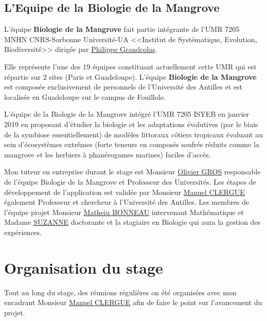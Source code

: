 
        \subsection{L'Equipe de la Biologie de la Mangrove}
        L'équipe \textbf{Biologie de la Mangrove} fait partie intégrante de l'UMR 7205 MNHN CNRS-Sorbonne Université-UA <<Institut de Systématique, Evolution, Biodiversité>> dirigée par \underline{Philippe Grandcolas}.

        \vspace{0.5cm}

        \begin{flushleft}
            Elle représente l'une des 19 équipes constituant actuellement cette UMR qui est répartie sur 2 sites (Paris et Guadeloupe). L'équipe \textbf{Biologie de la Mangrove} est composée exclusivement de personnels de l'Université des Antilles et est localisée en Guadeloupe sur le campus de Fouillole.

            \vspace{0.5cm}
            
            L'équipe de la Biologie de la Mangrove intégré l'UMR 7205 ISYEB en janvier 2019 en proposant d'étudier la biologie et les adaptations évolutives (par le biais de la symbiose essentiellement) de modèles littoraux côtiers tropicaux évoluant au sein d'écosystèmes extrêmes (forte teneurs en composés soufrés réduits comme la mangrove et les herbiers à phanérogames marines) faciles d'accès.
        
            \vspace{0.5cm}
        
            Mon tuteur en entreprise durant le stage est Monsieur \underline{Olivier GROS} responsable de l'équipe Biologie de la Mangrove et Professeur des Universités.
            Les étapes de développement de l'application est validée par Monsieur \underline{Manuel CLERGUE} également Professeur et chercheur à l'Université des Antilles.
            Les membres de l'équipe projet Monsieur \underline{Matheiu BONNEAU} intervenant Mathématique et Madame \underline{SUZANNE} doctorante et la stagiaire en Biologie qui aura la gestion des expériences.

        \end{flushleft}

    \section{Organisation du stage} 
    Tout au long du stage, des réunions régulières on été organisées avec mon encadrant Monsieur \underline{Manuel CLERGUE} afin de faire le point sur l'avancement du projet.

